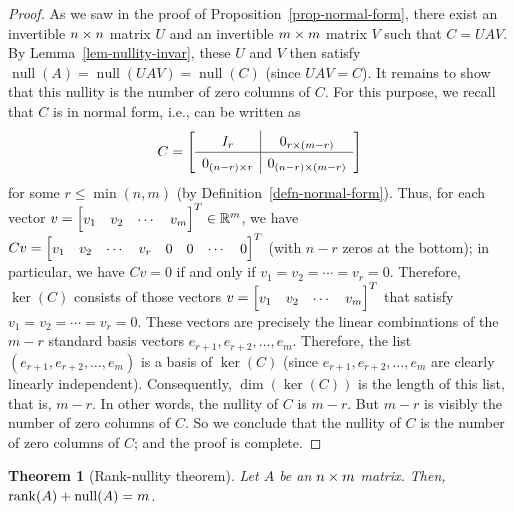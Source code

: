 \documentclass[reqno]{amsart}
\newtheorem{theorem}{Theorem}[section]
\theoremstyle{definition}
\newcommand{\nullity}{\operatorname{null}}
\begin{document}
\begin{proof}
As we saw in the proof of Proposition~\ref{prop-normal-form},
there exist an invertible $n\times n$ matrix $U$ and an
invertible $m\times m$ matrix $V$ such that $C=UAV$.
By Lemma~\ref{lem-nullity-invar}, these $U$ and $V$ then satisfy
 $\nullity(A) = \nullity(UAV) = \nullity(C)$ (since $UAV=C$).
It remains to show that this nullity is the
number of zero columns of $C$.
For this purpose, we recall that $C$ is in normal form, i.e., can
be written as
\[ C = {\renewcommand{\arraystretch}{1.3}
     \left[\begin{array}{c|c}
      I_r & 0_{r\tm (m-r)} \\ \hline
      0_{(n-r)\tm r} & 0_{(n-r)\tm(m-r)}
     \end{array}\right]}
 \]
for some $r \leq \min(n,m)$ (by Definition~\ref{defn-normal-form}).
Thus, for each vector $v = \bbm v_1 & v_2 & \cdots & v_m \ebm^T
\in \R^m$, we have $Cv = \bbm v_1 & v_2 & \cdots & v_r & 0 & 0 & \cdots & 0 \ebm^T$
(with $n-r$ zeros at the bottom);
in particular, we have $Cv = 0$ if and only if $v_1 = v_2 = \cdots = v_r = 0$.
Therefore, $\ker(C)$ consists of those vectors $v = \bbm v_1 & v_2 & \cdots & v_m \ebm^T$
that satisfy $v_1 = v_2 = \cdots = v_r = 0$.
These vectors are precisely the linear combinations of the $m-r$
standard basis vectors $e_{r+1}, e_{r+2}, \ldots, e_m$.
Therefore, the list $\left(e_{r+1}, e_{r+2}, \ldots, e_m\right)$
is a basis of $\ker(C)$ (since $e_{r+1}, e_{r+2}, \ldots, e_m$
are clearly linearly independent). Consequently, $\dim(\ker(C))$
is the length of this list, that is, $m-r$.
In other words, the nullity of $C$ is $m-r$.
But $m-r$ is visibly the number of zero columns of $C$.
So we conclude that the nullity of $C$ is the number of
zero columns of $C$; and the proof is complete.
\end{proof}

\begin{theorem}[Rank-nullity theorem]\label{thm-rank-nullity}
 Let $A$ be an $n\times m$ matrix.
 Then, $\rnk(A) + \nullity(A) = m$.
\end{theorem}
\end{document}
